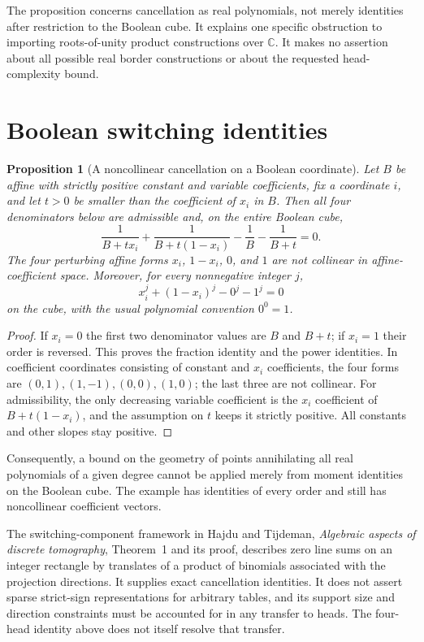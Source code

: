 \documentclass[11pt]{article}
\newtheorem{proposition}{Proposition}
\begin{document}
The proposition concerns cancellation as real polynomials, not merely
identities after restriction to the Boolean cube. It explains one
specific obstruction to importing roots-of-unity product constructions
over $\mathbb C$. It makes no assertion about all possible real border
constructions or about the requested head-complexity bound.

\section{Boolean switching identities}

\begin{proposition}[A noncollinear cancellation on a Boolean coordinate]
Let $B$ be affine with strictly positive constant and variable
coefficients, fix a coordinate $i$, and let $t>0$ be smaller than
the coefficient of $x_i$ in $B$. Then all four denominators below
are admissible and, on the entire Boolean cube,
\[
 \frac1{B+t x_i}+\frac1{B+t(1-x_i)}
 -\frac1B-\frac1{B+t}=0.
\]
The four perturbing affine forms $x_i$, $1-x_i$, $0$, and $1$
are not collinear in affine-coefficient space. Moreover, for every
nonnegative integer $j$,
\[
 x_i^j+(1-x_i)^j-0^j-1^j=0
\]
on the cube, with the usual polynomial convention $0^0=1$.
\end{proposition}
\begin{proof}
If $x_i=0$ the first two denominator values are $B$ and $B+t$;
if $x_i=1$ their order is reversed. This proves the fraction identity
and the power identities. In coefficient coordinates consisting of
constant and $x_i$ coefficients, the four forms are
$(0,1),(1,-1),(0,0),(1,0)$; the last three are not collinear.
For admissibility, the only decreasing variable coefficient is the
$x_i$ coefficient of $B+t(1-x_i)$, and the assumption on $t$ keeps
it strictly positive. All constants and other slopes stay positive.
\end{proof}

Consequently, a bound on the geometry of points annihilating all real
polynomials of a given degree cannot be applied merely from moment
identities on the Boolean cube. The example has identities of every
order and still has noncollinear coefficient vectors.

The switching-component framework in Hajdu and Tijdeman,
\emph{Algebraic aspects of discrete tomography}, Theorem~1 and its
proof, describes zero line sums on an integer rectangle by translates
of a product of binomials associated with the projection directions.
It supplies exact cancellation identities. It does not assert sparse
strict-sign representations for arbitrary tables, and its support
size and direction constraints must be accounted for in any transfer
to heads. The four-head identity above does not itself resolve that
transfer.
\end{document}
